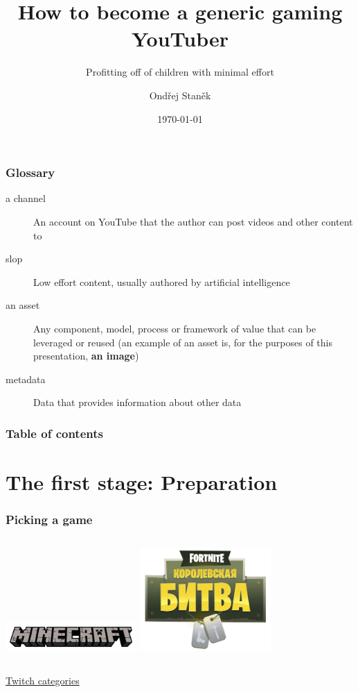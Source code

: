 \documentclass{beamer}
\title{How to become a generic gaming YouTuber}
\subtitle{Profitting off of children with minimal effort}
\author{Ondřej Staněk}
\institute{V.A}
\date{\today}
\begin{document}

\begin{frame}
	\titlepage
\end{frame}

\begin{frame}
	\frametitle{Glossary}

	\begin{description}
		\item[a channel] An account on YouTube that the author can post videos and other content to
		\item[slop] Low effort content, usually authored by artificial intelligence
		\item[an asset] Any component, model, process or framework of value that can be leveraged or reused (an
		      example of an asset is, for the purposes of this presentation, \textbf{an image})
		\item[metadata] Data that provides information about other data
	\end{description}
\end{frame}

\begin{frame}
	\frametitle{Table of contents}
	\tableofcontents
\end{frame}

\section{The first stage: Preparation}
\begin{frame}
	\frametitle{Picking a game}

	\begin{columns}
		\includegraphics[width=5cm, center]{minecraft-logo.png}
		\centering
		\includegraphics[width=5cm, center]{fortnite-logo.png}
	\end{columns}

	\begin{center}
		\href{https://www.twitch.tv/directory/gaming}{Twitch categories}
	\end{center}
\end{frame}
\end{document}
